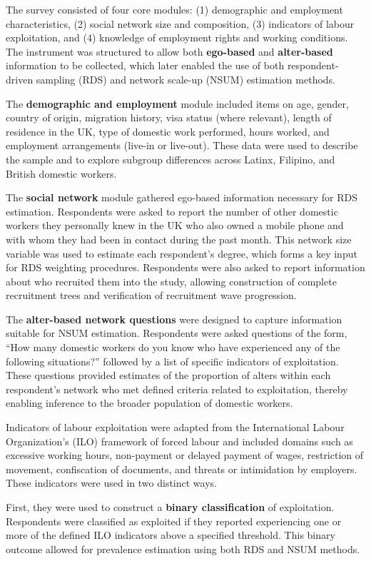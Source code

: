 \documentclass[
  12pt,
  letterpaper,
  DIV=11,
  numbers=noendperiod]{scrartcl}
\theoremstyle{plain}
\theoremstyle{definition}
\begin{document}
The survey consisted of four core modules: (1) demographic and
employment characteristics, (2) social network size and composition, (3)
indicators of labour exploitation, and (4) knowledge of employment
rights and working conditions. The instrument was structured to allow
both \textbf{ego-based} and \textbf{alter-based} information to be
collected, which later enabled the use of both respondent-driven
sampling (RDS) and network scale-up (NSUM) estimation methods.

The \textbf{demographic and employment} module included items on age,
gender, country of origin, migration history, visa status (where
relevant), length of residence in the UK, type of domestic work
performed, hours worked, and employment arrangements (live-in or
live-out). These data were used to describe the sample and to explore
subgroup differences across Latinx, Filipino, and British domestic
workers.

The \textbf{social network} module gathered ego-based information
necessary for RDS estimation. Respondents were asked to report the
number of other domestic workers they personally knew in the UK who also
owned a mobile phone and with whom they had been in contact during the
past month. This network size variable was used to estimate each
respondent's degree, which forms a key input for RDS weighting
procedures. Respondents were also asked to report information about who
recruited them into the study, allowing construction of complete
recruitment trees and verification of recruitment wave progression.

The \textbf{alter-based network questions} were designed to capture
information suitable for NSUM estimation. Respondents were asked
questions of the form, ``How many domestic workers do you know who have
experienced any of the following situations?'' followed by a list of
specific indicators of exploitation. These questions provided estimates
of the proportion of alters within each respondent's network who met
defined criteria related to exploitation, thereby enabling inference to
the broader population of domestic workers.

Indicators of labour exploitation were adapted from the International
Labour Organization's (ILO) framework of forced labour and included
domains such as excessive working hours, non-payment or delayed payment
of wages, restriction of movement, confiscation of documents, and
threats or intimidation by employers. These indicators were used in two
distinct ways.

First, they were used to construct a \textbf{binary classification} of
exploitation. Respondents were classified as exploited if they reported
experiencing one or more of the defined ILO indicators above a specified
threshold. This binary outcome allowed for prevalence estimation using
both RDS and NSUM methods.
\end{document}
